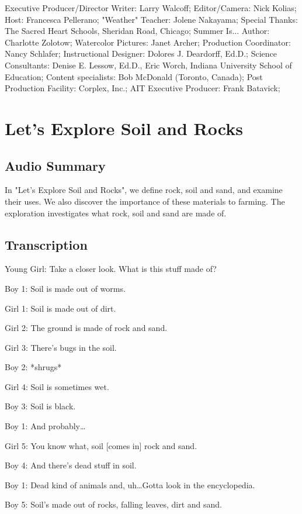 Executive Producer/Director Writer: Larry Walcoff;
Editor/Camera: Nick Kolias;
Host: Francesca Pellerano;
"Weather" Teacher: Jolene Nakayama;
Special Thanks: The Sacred Heart Schools, Sheridan Road, Chicago;
Summer Is... Author: Charlotte Zolotow;
Watercolor Pictures: Janet Archer;
Production Coordinator: Nancy Schlafer;
Instructional Designer: Dolores J. Deardorff, Ed.D.;
Science Consultants: Denise E. Lessow, Ed.D., Eric Worch, Indiana University School of Education;
Content specialists: Bob McDonald (Toronto, Canada);
Post Production Facility: Corplex, Inc.;
AIT Executive Producer: Frank Batavick;

\section{Let's Explore Soil and Rocks}

\subsection{Audio Summary}

In "Let's Explore Soil and Rocks", we define rock, soil and sand, and examine their uses. We also discover the importance of these materials to farming. The exploration investigates what rock, soil and sand are made of.

\subsection{Transcription}

Young Girl: Take a closer look. What is this stuff made of?

Boy 1: Soil is made out of worms.

Girl 1: Soil is made out of dirt.

Girl 2: The ground is made of rock and sand.

Girl 3: There's bugs in the soil.

Boy 2: *shrugs*

Girl 4: Soil is sometimes wet.

Boy 3: Soil is black.

Boy 1: And probably\dots

Girl 5: You know what, soil [comes in] rock and sand.

Boy 4: And there's dead stuff in soil.

Boy 1: Dead kind of animals and, uh\dots Gotta look in the encyclopedia.

Boy 5: Soil's made out of rocks, falling leaves, dirt and sand.

